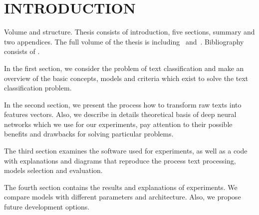 \chapter*{INTRODUCTION}							%

\newcommand{\actuality}{Relevance of the problem.}
\newcommand{\aim}{The objective}
\newcommand{\tasks}{Task}
\newcommand{\defpositions}{\textbf{Основные положения, выносимые на~защиту:}}
\newcommand{\novelty}{Scientific novelty:}
\newcommand{\influence}{Scientific and practical significance}
\newcommand{\reliability}{\textbf{Степень достоверности}}
\newcommand{\probation}{\textbf{Апробация работы.}}
\newcommand{\contribution}{Personal contribution.}
\newcommand{\publications}{Publications.}

%

Volume and structure. Thesis consists of introduction, five sections, summary and two appendices. The full volume of the thesis is  
including~
and~.
Bibliography consists of .

In the first section, we consider the problem of text classification and make an overview of the basic concepts, models and criteria which exist to solve the text classification problem.

In the second section, we present the process how to transform raw texts into features vectors. Also, we describe in details theoretical basis of deep neural networks which we use for our experiments, pay attention to their possible benefits and drawbacks for solving particular problems.

The third section examines the software used for experiments, as well as a code with explanations and diagrams that reproduce the process text processing, models selection and evaluation. 

The fourth section contains the results and explanations of experiments. We compare models with different parameters and architecture. Also, we propose future development options.
